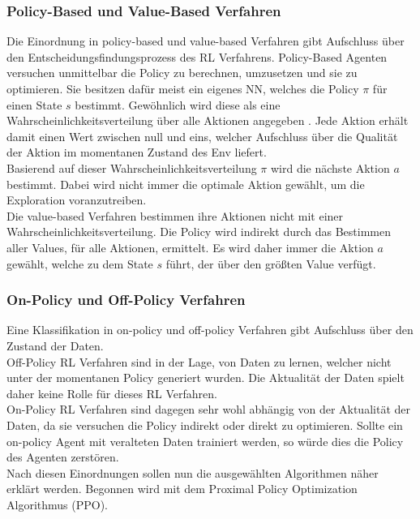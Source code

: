\subsubsection{Policy-Based und Value-Based Verfahren} \label{subsubsec:Grundlagen_policy_value_based}
Die Einordnung in policy-based und value-based Verfahren gibt Aufschluss über den Entscheidungsfindungsprozess des RL Verfahrens.
Policy-Based Agenten versuchen unmittelbar die Policy zu berechnen, umzusetzen und sie zu optimieren. Sie besitzen dafür meist ein eigenes NN, welches die Policy $\pi$ für einen State $s$ bestimmt.
Gewöhnlich wird diese als eine Wahrscheinlichkeitsverteilung über alle Aktionen angegeben . Jede Aktion erhält damit einen Wert zwischen null und eins, welcher Aufschluss über die Qualität der Aktion im momentanen Zustand des Env liefert. \citep[S. 100]{DRL_Lapan} \\
Basierend auf dieser Wahrscheinlichkeitsverteilung $\pi$ wird die nächste Aktion $a$ bestimmt. Dabei wird nicht immer die optimale Aktion gewählt, um die Exploration voranzutreiben.\\
Die value-based Verfahren bestimmen ihre Aktionen nicht mit einer Wahrscheinlichkeitsverteilung. Die Policy wird indirekt durch das Bestimmen aller Values,  für alle Aktionen, ermittelt. Es wird daher immer die Aktion $a$ gewählt, welche zu dem State $s$ führt, der über den größten Value verfügt. \citep[S. 100]{DRL_Lapan}

\subsubsection{On-Policy und Off-Policy Verfahren} \label{subsubsec:Grundlagen_on_off_policy}
Eine Klassifikation in on-policy und off-policy Verfahren gibt Aufschluss über den Zustand der Daten.\\ 
Off-Policy RL Verfahren sind in der Lage, von Daten zu lernen, welcher nicht unter der momentanen Policy  generiert wurden. Die Aktualität der Daten spielt daher keine Rolle für dieses RL Verfahren.\\
On-Policy RL Verfahren sind dagegen sehr wohl abhängig von der Aktualität der Daten, da sie versuchen die Policy indirekt oder direkt zu optimieren. Sollte ein on-policy Agent mit veralteten Daten trainiert werden, so würde dies die Policy des Agenten zerstören. \citep[S. 210 f.]{DRL_Lapan}\\
Nach diesen Einordnungen sollen nun die ausgewählten Algorithmen näher erklärt werden. Begonnen wird mit dem Proximal Policy Optimization Algorithmus (PPO).

